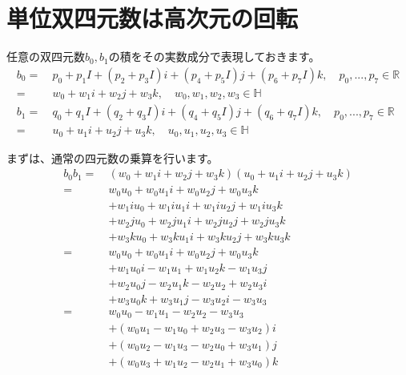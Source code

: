 \documentclass[a4paper,12pt,notitlepage]{jsreport}
\begin{document}
\section{単位双四元数は高次元の回転}

任意の双四元数$b_0,b_1$の積をその実数成分で表現しておきます。
\begin{equation}
\begin{split}
b_0=~&p_0+p_1I+(p_2+p_3I)i+(p_4+p_5I)j+(p_6+p_7I)k,\quad p_0,...,p_7\in\mathbb{R}\\
=~&w_0+w_1i+w_2j+w_3k,\quad w_0,w_1,w_2,w_3\in\mathbb{H}\\
b_1=~&q_0+q_1I+(q_2+q_3I)i+(q_4+q_5I)j+(q_6+q_7I)k,\quad p_0,...,p_7\in\mathbb{R}\\
=~&u_0+u_1i+u_2j+u_3k,\quad u_0,u_1,u_2,u_3\in\mathbb{H}
\end{split}
\end{equation}

まずは、通常の四元数の乗算を行います。
\begin{equation}
\begin{split}
b_0b_1=~&(w_0+w_1i+w_2j+w_3k)(u_0+u_1i+u_2j+u_3k)\\
=~&w_0u_0+w_0u_1i+w_0u_2j+w_0u_3k\\
&+w_1iu_0+w_1iu_1i+w_1iu_2j+w_1iu_3k\\
&+w_2ju_0+w_2ju_1i+w_2ju_2j+w_2ju_3k\\
&+w_3ku_0+w_3ku_1i+w_3ku_2j+w_3ku_3k\\
=~&w_0u_0+w_0u_1i+w_0u_2j+w_0u_3k\\
&+w_1u_0i-w_1u_1+w_1u_2k-w_1u_3j\\
&+w_2u_0j-w_2u_1k-w_2u_2+w_2u_3i\\
&+w_3u_0k+w_3u_1j-w_3u_2i-w_3u_3\\
=~&w_0u_0-w_1u_1-w_2u_2-w_3u_3\\
&+(w_0u_1-w_1u_0+w_2u_3-w_3u_2)i\\
&+(w_0u_2-w_1u_3-w_2u_0+w_3u_1)j\\
&+(w_0u_3+w_1u_2-w_2u_1+w_3u_0)k
\end{split}
\end{equation}
\end{document}
